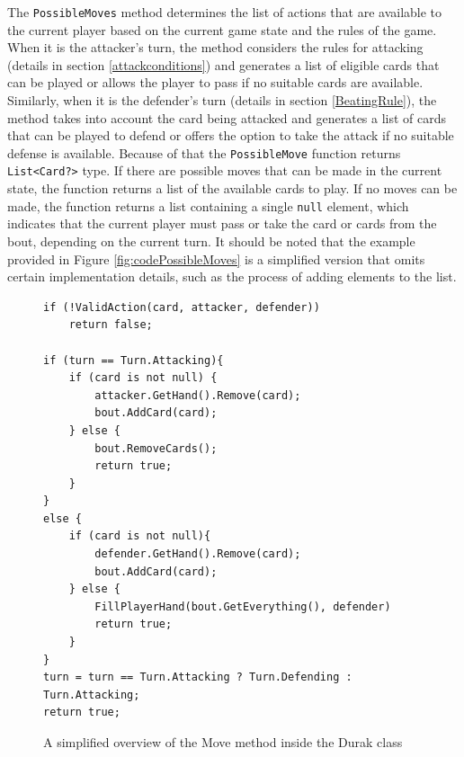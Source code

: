 The \texttt{PossibleMoves} method determines the list of actions that are available to the current player based on the current game state and the rules of the game. When it is the attacker's turn, the method considers the rules for attacking (details in section \ref{attackconditions}) and generates a list of eligible cards that can be played or allows the player to pass if no suitable cards are available. Similarly, when it is the defender's turn (details in section \ref{BeatingRule}), the method takes into account the card being attacked and generates a list of cards that can be played to defend or offers the option to take the attack if no suitable defense is available. Because of that the \texttt{PossibleMove} function returns \texttt{List<Card?>} type. If there are possible moves that can be made in the current state, the function returns a list of the available cards to play. If no moves can be made, the function returns a list containing a single \texttt{null} element, which indicates that the current player must pass or take the card or cards from the bout, depending on the current turn. It should be noted that the example provided in Figure \ref{fig:codePossibleMoves} is a simplified version that omits certain implementation details, such as the process of adding elements to the list. 

\begin{figure}[h]
\captionsetup{justification=centering}
\begin{lstlisting}
if (!ValidAction(card, attacker, defender)) 
    return false;
	
if (turn == Turn.Attacking){
    if (card is not null) {
        attacker.GetHand().Remove(card);
        bout.AddCard(card);
    } else {
        bout.RemoveCards();
        return true;
    }
}
else {
    if (card is not null){
        defender.GetHand().Remove(card);
        bout.AddCard(card);
    } else {
        FillPlayerHand(bout.GetEverything(), defender)
        return true;
    }	
}
turn = turn == Turn.Attacking ? Turn.Defending : Turn.Attacking;
return true;
\end{lstlisting}
\caption{A simplified overview of the Move method inside the Durak class}
\label{fig:codeMove}
\end{figure}

